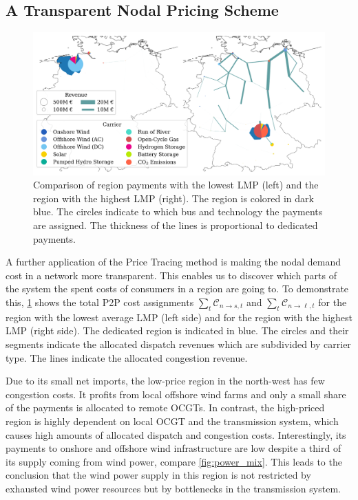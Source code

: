 \documentclass[11pt,twocolumn]{article}
\newcommand{\cost}{\mathcal{C}}
\newcommand{\allocategeneratorcost}[1][n \rightarrow s]{\cost_{#1, t}}
\newcommand{\allocatelinecost}[1][n \rightarrow \ell]{\cost_{#1, t}}
\begin{document}
\subsection{A Transparent Nodal Pricing Scheme}


\begin{figure}[h!]
    \includegraphics[width=\linewidth]{de50/allocated_payment_comparison}
    \caption{Comparison of region payments with the lowest \ac{LMP} (left) and the region with the highest \ac{LMP} (right). The region is colored in dark blue. The circles indicate to which bus and technology the payments are assigned. The thickness of the lines is proportional to dedicated payments.}
    \label{fig:direct-allocation}
\end{figure}

A further application of the Price Tracing method is making the nodal demand cost in a network more transparent. This enables us to discover which parts of the system the spent costs of consumers in a region are going to. To demonstrate this, \cref{fig:direct-allocation} shows the total \ac{P2P} cost assignments $\sum_t \allocategeneratorcost$ and $\sum_t  \allocatelinecost$ for the region with the lowest average \ac{LMP} (left side) and for the region with the highest \ac{LMP} (right side). The dedicated region is indicated in blue. The circles and their segments indicate the allocated dispatch revenues which are subdivided by carrier type. The lines indicate the allocated congestion revenue. 

Due to its small net imports, the low-price region in the north-west has few congestion costs. It profits from local offshore wind farms and only a small share of the payments is allocated to remote \acp{OCGT}. In contrast, the high-priced region is highly dependent on local \ac{OCGT} and the transmission system, which causes high amounts of allocated dispatch and congestion costs. Interestingly, its payments to  onshore and offshore wind infrastructure are low despite a third of its supply coming from wind power, compare \cref{fig:power_mix}. This leads to the conclusion that the wind power supply in this region is not restricted by exhausted wind power resources but by bottlenecks in the transmission system.  
\end{document}
